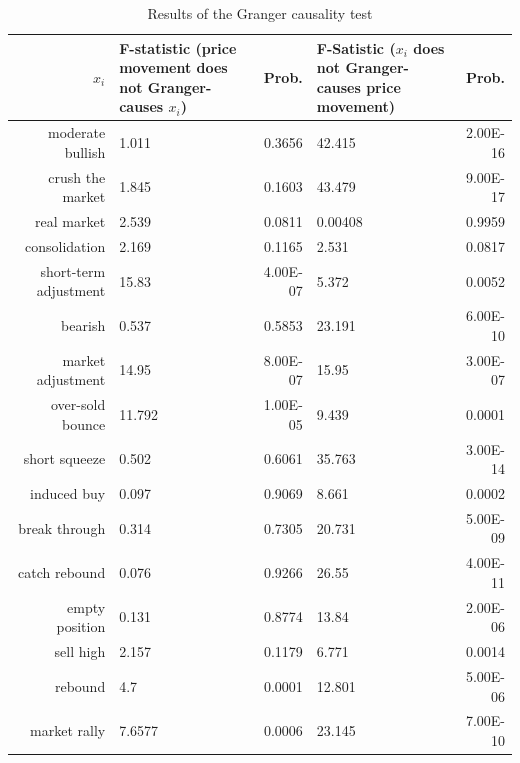 \documentclass[review,3p,times,12pt,number]{elsarticle}
\begin{document}
\begin{table}[htbp]
\caption{ Results of the Granger causality test}
\footnotesize
\center
\label{tab:weibo:grangerCausality}
\begin{tabular}{r p{3cm} r|| p{3cm} r}
\hline
        $x_i$ & F-statistic (price movement does not Granger-causes $x_i$) &      Prob. & F-Satistic ($x_i$ does not Granger-causes price movement) &      Prob. \\
\hline
moderate bullish      &      1.011 &     0.3656 &     42.415 &   2.00E-16 \\

crush the market      &      1.845 &     0.1603 &     43.479 &   9.00E-17 \\

real market           &      2.539 &     0.0811 &    0.00408 &     0.9959 \\

consolidation         &      2.169 &     0.1165 &      2.531 &     0.0817 \\

short-term adjustment &      15.83 &   4.00E-07 &      5.372 &     0.0052 \\

   bearish            &      0.537 &     0.5853 &     23.191 &   6.00E-10 \\

market adjustment     &      14.95 &   8.00E-07 &      15.95 &   3.00E-07 \\

over-sold bounce      &     11.792 &   1.00E-05 &      9.439 &     0.0001 \\

short squeeze         &      0.502 &     0.6061 &     35.763 &   3.00E-14 \\

induced buy           &      0.097 &     0.9069 &      8.661 &     0.0002 \\

break through          &      0.314 &     0.7305 &     20.731 &   5.00E-09 \\

catch rebound         &      0.076 &     0.9266 &      26.55 &   4.00E-11 \\

empty position        &      0.131 &     0.8774 &      13.84 &   2.00E-06 \\

 sell high            &      2.157 &     0.1179 &      6.771 &     0.0014 \\

   rebound            &        4.7 &     0.0001 &     12.801 &   5.00E-06 \\

market rally &     7.6577 &     0.0006 &     23.145 &   7.00E-10 \\
\hline
\end{tabular}
\end{table}
\end{document}

